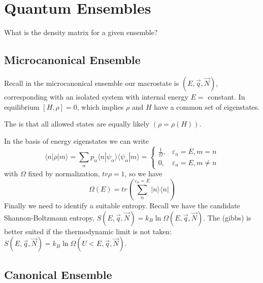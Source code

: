 \documentclass[12pt, a4paper, oneside, openright, titlepage]{book}
\begin{document}
\chapter{Quantum Ensembles}

\begin{qst}
    What is the density matrix for a given ensemble?
\end{qst}

\section{Microcanonical Ensemble}

Recall in the microcanonical ensemble our macrostate is $(E,\vec{q},\vec{N})$, corresponding with an isolated system with internal energy $E = $ constant. In equilibrium $[H,\rho] = 0$, which implies $\rho$ and $H$ have a common set of eigenstates.

\begin{rmk}
    The  is that all allowed states are equally likely $(\rho = \rho(H))$.
\end{rmk}

In the basis of energy eigenstates we can write \begin{equation*}
    \langle n|\rho|m\rangle = \sum_{\alpha}p_{\alpha}\langle n|\psi_{\alpha}\rangle\langle \psi_{\alpha}|m\rangle = \left\{\begin{array}{cc} \frac{1}{\Omega}, & \varepsilon_n = E, m =n \\ 0, & \varepsilon_n = E, m \neq n \end{array}\right.
\end{equation*}
with $\Omega$ fixed by normalization, $tr\rho = 1$, so we have \begin{equation*}
    \Omega(E) = tr\left(\sum_n^{\varepsilon_n = E}|n\rangle \langle n|\right)
\end{equation*}
Finally we need to identify a suitable entropy. Recall we have the candidate Shannon-Boltzmann entropy, $S(E,\vec{q},\vec{N}) = k_B\ln\Omega(E,\vec{q},\vec{N})$. The  (gibbs) is better suited if the thermodynamic limit is not taken: $S(E,\vec{q},\vec{N}) = k_B\ln\Omega(U< E,\vec{q},\vec{N})$.

\section{Canonical Ensemble}
\end{document}
